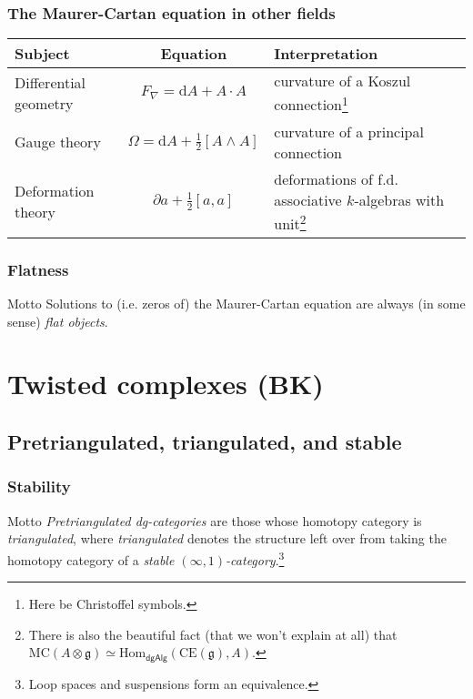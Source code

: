 \documentclass{beamer}
\begin{document}
        \begin{frame}\frametitle{The Maurer-Cartan equation in other fields}
            \begin{table}
                \begin{tabular}{p{1.8cm}cp{3.9cm}}\toprule
                    Subject & Equation & Interpretation\\\midrule
                    Differential geometry & $F_\nabla = \mathrm{d}A + A\cdot A$ & curvature of a Koszul connection\footnote{Here be Christoffel symbols.}\\[.5em]
                    Gauge theory & $\Omega = \mathrm{d}A + \frac12[A\wedge A]$ & curvature of a principal connection\\[.5em]
                    Deformation theory & $\partial a+\frac12[a,a]$ & deformations of f.d. associative $k$-algebras with unit\footnote{There is also the beautiful fact (that we won't explain at all) that $\mathrm{MC}(A\otimes\mathfrak{g}) \simeq \mathrm{Hom}_\mathsf{dgAlg}(\mathrm{CE}(\mathfrak{g}),A)$.}
                    \\\bottomrule
                \end{tabular}
            \end{table}
        \end{frame}

        \begin{frame}\frametitle{Flatness}
            \begin{block}{Motto}
                Solutions to (i.e. zeros of) the Maurer-Cartan equation are always (in some sense) \emph{flat objects}.
            \end{block}
        \end{frame}


\section{Twisted complexes (BK)}
    
    \subsection{Pretriangulated, triangulated, and stable}

        \begin{frame}\frametitle{Stability}
            \begin{block}{Motto}
                \emph{Pretriangulated dg-categories} are those whose homotopy category is \emph{triangulated}, where \emph{triangulated} denotes the structure left over from taking the homotopy category of a \emph{stable $(\infty,1)$-category}.\footnote{Loop spaces and suspensions form an equivalence.}
            \end{block}
        \end{frame}
\end{document}

